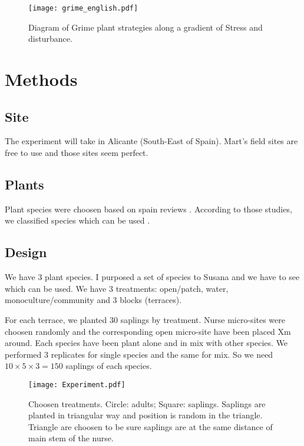\documentclass[12pt]{article} %
\begin{document}
\begin{figure}
\begin{center}
\texttt{[image: grime\_english.pdf]}
\end{center}
\caption{Diagram of Grime plant strategies along a gradient of Stress and disturbance.\label{Grime}}
\end{figure}





\section{Methods}

\subsection{Site}

The experiment will take in Alicante (South-East of Spain). Mart's field sites are free to use and those sites seem perfect.

\subsection{Plants}

Plant species were choosen based on spain reviews \citep{McCluney2012,Navarro2006, Jauffret2003}. According to those studies, we classified species which can be used .



\subsection{Design}

We have 3 plant species. I purposed a set of species to Susana and we have to see which can be used. We have 3 treatments: open/patch, water, monoculture/community and 3 blocks (terraces).

For each terrace, we planted 30 saplings by treatment. Nurse micro-sites were choosen randomly and the corresponding open micro-site have been placed Xm around. Each species have been plant alone and in mix with other species. We performed 3 replicates for single species and the same for mix. So we need $10\times5\times3=150$ saplings of each species.


\begin{figure} %
\begin{center}
\texttt{[image: Experiment.pdf]}
\end{center}
\caption{Choosen treatments. Circle: adults; Square: saplings. Saplings are planted in triangular way and position is random in the triangle. Triangle are choosen to be sure saplings are at the same distance of main stem of the nurse. \label{exp}}
\end{figure}
\end{document}
